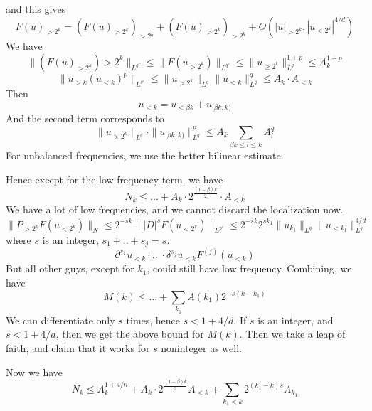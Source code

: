 and this gives 
\begin{equation*}
    F(u)_{>2^k}=(F(u)_{>2^k})_{>2^k}+(F(u)_{>2^k})_{>2^k}+O(|u|_{>2^k}, |u_{<2^k}|^{4/d})
\end{equation*}
We have 
\begin{equation*}
    \|(F(u)_{>2^k}){>2^k}\|_{L^{q'}}\leq \|F(u_{>2^k})\|_{L^{q'}}\leq \|u_{\geq 2^k}\|_{L^q}^{1+p}\leq A_k^{1+p}
\end{equation*}
\begin{equation*}
    \|u_{>k}(u_{<k})^p\|_{L^{q'}}\leq \|u_{>2^k}\|_{L^q}\|u_{<k}\|_{L^q}^q\leq A_k\cdot A_{<k}
\end{equation*}
Then 
\begin{equation*}
    u_{<k}=u_{<\beta k}+u_{[\beta k, k)}
\end{equation*}
And the second term corresponds to 
\begin{equation*}
    \|u_{>2^k}\|_{L^q}\cdot\|u_{[\beta k, k)}\|_{L^q}^p\leq A_k\sum_{{\beta k\leq l\leq k}}A_l^q
\end{equation*}
For unbalanced frequencies, we use the better bilinear estimate.

Hence except for the low frequency term, we have
\begin{equation*}
    N_k\leq ...+ A_k\cdot 2^\frac{(1-\beta)k}{2}\cdot A_{<k}
\end{equation*}
We have a lot of low frequencies, and we cannot discard the localization now.
\begin{equation*}
    \|P_{>2^k}F(u_{<2^k})\|_N\leq 2^{-sk}\||D|^sF(u_{<2^k})\|_{L^{p'}}\leq 2^{-sk}2^{sk_1}\|u_{k_1}\|_{L^q}\|u_{<k_1}\|_{L^q}^{4/d}
\end{equation*}
where $s$ is an integer, $s_1+..+s_j=s$.
\begin{equation*}
    \partial^{s_1}u_{<k}\cdot...\cdot\delta^{s_j}u_{<k}F^{(j)}(u_{<k})
\end{equation*}
But all other guys, except for $k_1$, could still have low frequency. Combining, we have 
\begin{equation*}
    M(k)\leq ...+\sum_{k_1}A(k_1)2^{-s(k-k_1)}
\end{equation*}
We can differentiate only $s$ times, hence $s<1+4/d$. If $s$ is an integer, and $s<1+4/d$, then we get the above bound for $M(k)$. Then we take a leap of faith, and claim that it works for $s$ noninteger as well.

Now we have
\begin{equation*}
    N_k\leq A_k^{1+4/n}+A_k\cdot 2^\frac{(1-\beta)k}{2}A_{<k}+\sum_{k_1<k}2^{(k_1-k)s}A_{k_1}
\end{equation*}

